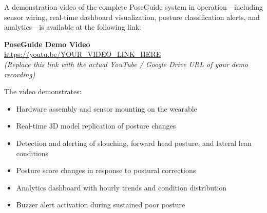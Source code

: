 \documentclass[12pt,a4paper]{report}
\begin{document}
A demonstration video of the complete PoseGuide system in operation—including sensor wiring, real-time dashboard visualization, posture classification alerts, and analytics—is available at the following link:

\vspace{0.5cm}
\begin{center}
\begin{mdframed}[linecolor=primaryblue, linewidth=1.5pt, innertopmargin=12pt, innerbottommargin=12pt,
                 backgroundcolor=primaryblue!5]
\centering
\large\textbf{PoseGuide Demo Video}\\[0.5em]
\url{https://youtu.be/YOUR_VIDEO_LINK_HERE}\\[0.3em]
{\small\textit{(Replace this link with the actual YouTube / Google Drive URL of your demo recording)}}
\end{mdframed}
\end{center}

\vspace{0.5cm}
The video demonstrates:
\begin{itemize}[leftmargin=2em]
    \item Hardware assembly and sensor mounting on the wearable
    \item Real-time 3D model replication of posture changes
    \item Detection and alerting of slouching, forward head posture, and lateral lean conditions
    \item Posture score changes in response to postural corrections
    \item Analytics dashboard with hourly trends and condition distribution
    \item Buzzer alert activation during sustained poor posture
\end{itemize}
\end{document}
